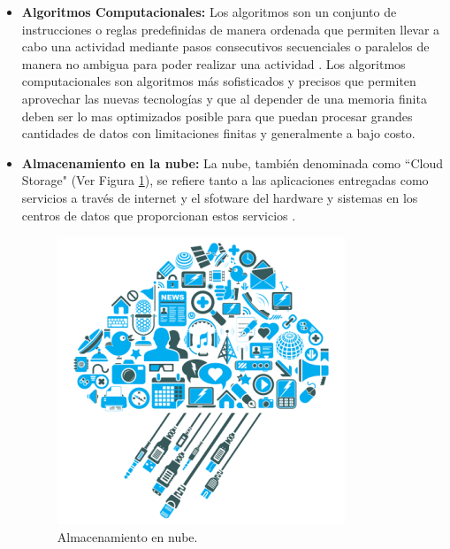 \begin{itemize}

	\item \textbf{Algoritmos Computacionales:}
	Los algoritmos son un conjunto de instrucciones o reglas predefinidas de manera ordenada que permiten llevar a cabo una actividad mediante pasos consecutivos secuenciales o paralelos de manera no ambigua para poder realizar una actividad \cite{algoritmo}. Los algoritmos computacionales son algoritmos más sofisticados y precisos que permiten aprovechar las nuevas tecnolog\'ias y que al depender de una memoria finita deben ser lo mas optimizados posible para que puedan procesar grandes cantidades de datos con limitaciones finitas y generalmente a bajo costo. 

	\item \textbf{Almacenamiento en la nube:}
	 La nube, también denominada como ``Cloud Storage" (Ver Figura \ref{cloudpng}), se refiere tanto a las aplicaciones entregadas como servicios a través de internet y el sfotware del hardware y sistemas en los centros de datos que proporcionan estos servicios \cite{cloud2}.
	\begin{figure}[H]
	\begin{center}
		\includegraphics[scale=0.35]{img/cloud.png}
	\end{center}
	\caption{Almacenamiento en nube. \label{cloudpng}}
	\end{figure}


\end{itemize}
